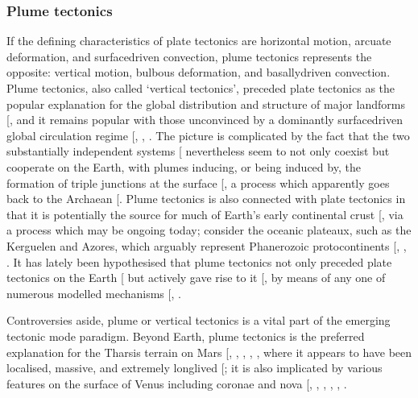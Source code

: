 \documentclass[letterpaper,10pt,english]{jupyterBook}
\begin{document}
\subsubsection{Plume tectonics}
\label{\detokenize{content/chapter_01_background/main:plume-tectonics}}
\sphinxAtStartPar
If the defining characteristics of plate tectonics are horizontal motion, arcuate deformation, and surface\sphinxhyphen{}driven convection, plume tectonics represents the opposite: vertical motion, bulbous deformation, and basally\sphinxhyphen{}driven convection. Plume tectonics, also called ‘vertical tectonics’, preceded plate tectonics as the popular explanation for the global distribution and structure of major landforms {[}\sphinxcite{references:id230}{]}, and it remains popular with those unconvinced by a dominantly surface\sphinxhyphen{}driven global circulation regime {[}, , \sphinxcite{references:id501}{]}. The picture is complicated by the fact that the two substantially independent systems {[}\sphinxcite{references:id228}{]} nevertheless seem to not only co\sphinxhyphen{}exist but cooperate on the Earth, with plumes inducing, or being induced by, the formation of triple junctions at the surface {[}\sphinxcite{references:id235}{]}, a process which apparently goes back to the Archaean {[}\sphinxcite{references:id234}{]}. Plume tectonics is also connected with plate tectonics in that it is potentially the source for much of Earth’s early continental crust {[}, \sphinxcite{references:id429}{]} via a process which may be ongoing today; consider the oceanic plateaux, such as the Kerguelen and Azores, which arguably represent Phanerozoic proto\sphinxhyphen{}continents {[}, , \sphinxcite{references:id706}{]}. It has lately been hypothesised that plume tectonics not only preceded plate tectonics on the Earth {[}\sphinxcite{references:id743}{]} but actively gave rise to it {[}\sphinxcite{references:id233}{]}, by means of any one of numerous modelled mechanisms {[}, \sphinxcite{references:id366}{]}.

\sphinxAtStartPar
Controversies aside, plume or vertical tectonics is a vital part of the emerging tectonic mode paradigm. Beyond Earth, plume tectonics is the preferred explanation for the Tharsis terrain on Mars {[}, , , , \sphinxcite{references:id236}{]}, where it appears to have been localised, massive, and extremely long\sphinxhyphen{}lived {[}\sphinxcite{references:id504}{]}; it is also implicated by various features on the surface of Venus including coronae and nova {[}, , , , , \sphinxcite{references:id225}{]}.
\end{document}
